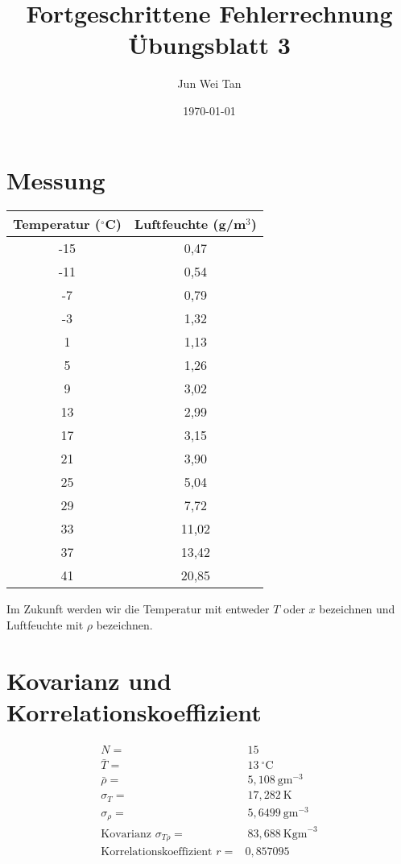 \documentclass[prb,12pt]{revtex4-2}
\theoremstyle{definition}
\theoremstyle{definition}
\begin{document}
\title{Fortgeschrittene Fehlerrechnung Übungsblatt 3}
	\author{Jun Wei Tan}
	\date{\today}
	\maketitle

\section{Messung}
\begin{center}
\begin{tabular}{cc}
	\toprule
	\textbf{Temperatur ($^{\circ}$C)} & \textbf{Luftfeuchte (g/m$^3$)} \\\midrule 
-15 & 0,47 \\\midrule
-11 & 0,54 \\\midrule
-7 & 0,79 \\\midrule
-3 & 1,32 \\\midrule
1 & 1,13 \\\midrule
5 & 1,26 \\\midrule
9 & 3,02 \\\midrule
13 & 2,99 \\\midrule
17 & 3,15 \\\midrule
21 & 3,90 \\\midrule
25 & 5,04 \\\midrule
29 & 7,72 \\\midrule
33 & 11,02 \\\midrule
37 & 13,42 \\\midrule
41 & 20,85 \\\bottomrule
\end{tabular}
\end{center}
Im Zukunft werden wir die Temperatur mit entweder $T$ oder $x$ bezeichnen und Luftfeuchte mit $\rho$ bezeichnen.
\section{Kovarianz und Korrelationskoeffizient}
\begin{align*}
	N=&~15\\
	\bar{T}=&~13~{}^{\circ}\text{C}\\
	\bar{\rho}=&~5,108~\text{gm}^{-3}\\
	\sigma_T=&~17,282~\text{K}\\
	\sigma_\rho=&~5,6499~\text{gm}^{-3}\\
	\text{Kovarianz }\sigma_{T\rho}=&~83,688~\text{Kgm}^{-3}\\
	\text{Korrelationskoeffizient }r=&0,857095
\end{align*}
\end{document}
